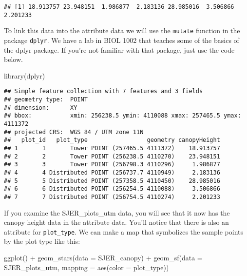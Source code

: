\documentclass[
]{book}
\newenvironment{Shaded}{\begin{snugshade}}{\end{snugshade}}
\newcommand{\AttributeTok}[1]{\textcolor[rgb]{0.77,0.63,0.00}{#1}}
\newcommand{\FunctionTok}[1]{\textcolor[rgb]{0.00,0.00,0.00}{#1}}
\newcommand{\NormalTok}[1]{#1}
\newcommand{\SpecialCharTok}[1]{\textcolor[rgb]{0.00,0.00,0.00}{#1}}
\begin{document}
\begin{verbatim}
## [1] 18.913757 23.948151  1.986877  2.183136 28.985016  3.506866  2.201233
\end{verbatim}

To link this data into the attribute data we will use the \texttt{mutate} function in the package \texttt{dplyr}. We have a lab in BIOL 1002 that teaches some of the basics of the dplyr package. If you're not familiar with that package, just use the code below.

\begin{Shaded}
\begin{Highlighting}[]
\FunctionTok{library}\NormalTok{(dplyr)}
\end{Highlighting}
\end{Shaded}

\begin{Shaded}
\end{Shaded}

\begin{verbatim}
## Simple feature collection with 7 features and 3 fields
## geometry type:  POINT
## dimension:      XY
## bbox:           xmin: 256238.5 ymin: 4110088 xmax: 257465.5 ymax: 4111372
## projected CRS:  WGS 84 / UTM zone 11N
##   plot_id   plot_type                 geometry canopyHeight
## 1       1       Tower POINT (257465.5 4111372)    18.913757
## 2       2       Tower POINT (256238.5 4110270)    23.948151
## 3       3       Tower POINT (256798.3 4110296)     1.986877
## 4       4 Distributed POINT (256737.7 4110949)     2.183136
## 5       5 Distributed POINT (257358.5 4110450)    28.985016
## 6       6 Distributed POINT (256254.5 4110088)     3.506866
## 7       7 Distributed POINT (256754.5 4110274)     2.201233
\end{verbatim}

If you examine the SJER\_plots\_utm data, you will see that it now has the canopy height data in the attribute data. You'll notice that there is also an attribute for \texttt{plot\_type}. We can make a map that symbolizes the sample points by the plot type like this:

\begin{Shaded}
\begin{Highlighting}[]
\FunctionTok{ggplot}\NormalTok{() }\SpecialCharTok{+}
  \FunctionTok{geom\_stars}\NormalTok{(}\AttributeTok{data =}\NormalTok{ SJER\_canopy) }\SpecialCharTok{+}
  \FunctionTok{geom\_sf}\NormalTok{(}\AttributeTok{data =}\NormalTok{ SJER\_plots\_utm, }\AttributeTok{mapping =} \FunctionTok{aes}\NormalTok{(}\AttributeTok{color =}\NormalTok{ plot\_type))}
\end{Highlighting}
\end{Shaded}
\end{document}
